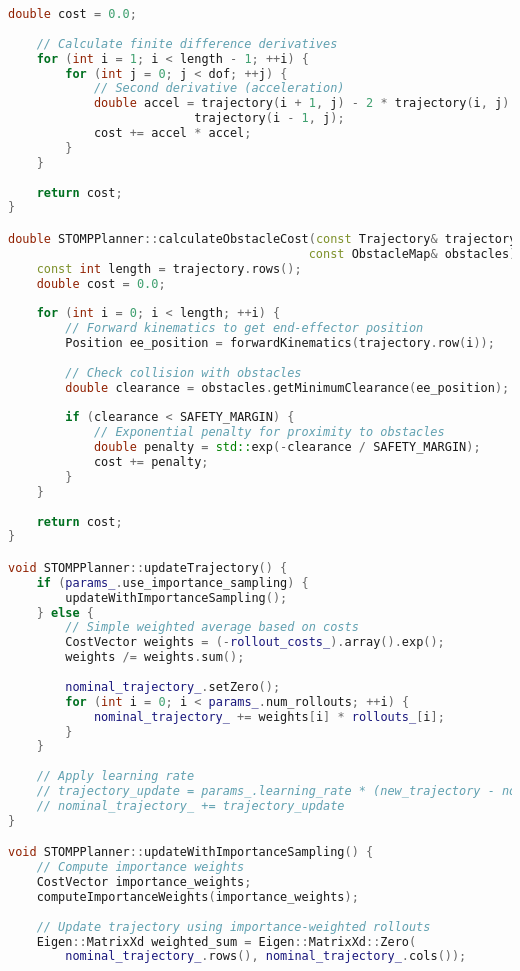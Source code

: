 \begin{lstlisting}[language=C++, caption={STOMP Path Planning Algorithm}, label={lst:app-stomp}]
    double cost = 0.0;
    
    // Calculate finite difference derivatives
    for (int i = 1; i < length - 1; ++i) {
        for (int j = 0; j < dof; ++j) {
            // Second derivative (acceleration)
            double accel = trajectory(i + 1, j) - 2 * trajectory(i, j) + 
                          trajectory(i - 1, j);
            cost += accel * accel;
        }
    }
    
    return cost;
}

double STOMPPlanner::calculateObstacleCost(const Trajectory& trajectory, 
                                          const ObstacleMap& obstacles) {
    const int length = trajectory.rows();
    double cost = 0.0;
    
    for (int i = 0; i < length; ++i) {
        // Forward kinematics to get end-effector position
        Position ee_position = forwardKinematics(trajectory.row(i));
        
        // Check collision with obstacles
        double clearance = obstacles.getMinimumClearance(ee_position);
        
        if (clearance < SAFETY_MARGIN) {
            // Exponential penalty for proximity to obstacles
            double penalty = std::exp(-clearance / SAFETY_MARGIN);
            cost += penalty;
        }
    }
    
    return cost;
}

void STOMPPlanner::updateTrajectory() {
    if (params_.use_importance_sampling) {
        updateWithImportanceSampling();
    } else {
        // Simple weighted average based on costs
        CostVector weights = (-rollout_costs_).array().exp();
        weights /= weights.sum();
        
        nominal_trajectory_.setZero();
        for (int i = 0; i < params_.num_rollouts; ++i) {
            nominal_trajectory_ += weights[i] * rollouts_[i];
        }
    }
    
    // Apply learning rate
    // trajectory_update = params_.learning_rate * (new_trajectory - nominal_trajectory_)
    // nominal_trajectory_ += trajectory_update
}

void STOMPPlanner::updateWithImportanceSampling() {
    // Compute importance weights
    CostVector importance_weights;
    computeImportanceWeights(importance_weights);
    
    // Update trajectory using importance-weighted rollouts
    Eigen::MatrixXd weighted_sum = Eigen::MatrixXd::Zero(
        nominal_trajectory_.rows(), nominal_trajectory_.cols());
    

\end{lstlisting}
